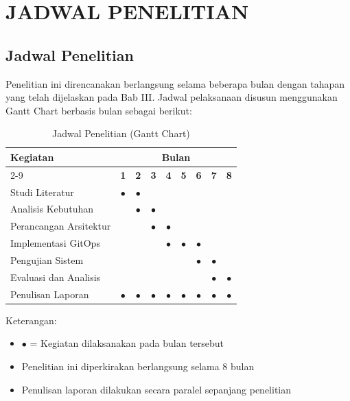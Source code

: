 \chapter{JADWAL PENELITIAN}

\section{Jadwal Penelitian}

Penelitian ini direncanakan berlangsung selama beberapa bulan dengan tahapan yang telah dijelaskan pada Bab III. Jadwal pelaksanaan disusun menggunakan Gantt Chart berbasis bulan sebagai berikut:

\begin{table}[H]
\centering
\caption{Jadwal Penelitian (Gantt Chart)}
\begin{tabular}{|l|c|c|c|c|c|c|c|c|}
\hline
\multirow{2}{*}{\textbf{Kegiatan}} & \multicolumn{8}{c|}{\textbf{Bulan}} \\
\cline{2-9}
 & \textbf{1} & \textbf{2} & \textbf{3} & \textbf{4} & \textbf{5} & \textbf{6} & \textbf{7} & \textbf{8} \\
\hline
Studi Literatur & $\bullet$ & $\bullet$ & & & & & & \\
\hline
Analisis Kebutuhan & & $\bullet$ & $\bullet$ & & & & & \\
\hline
Perancangan Arsitektur & & & $\bullet$ & $\bullet$ & & & & \\
\hline
Implementasi GitOps & & & & $\bullet$ & $\bullet$ & $\bullet$ & & \\
\hline
Pengujian Sistem & & & & & & $\bullet$ & $\bullet$ & \\
\hline
Evaluasi dan Analisis & & & & & & & $\bullet$ & $\bullet$ \\
\hline
Penulisan Laporan & $\bullet$ & $\bullet$ & $\bullet$ & $\bullet$ & $\bullet$ & $\bullet$ & $\bullet$ & $\bullet$ \\
\hline
\end{tabular}
\end{table}

Keterangan:
\begin{itemize}
    \item $\bullet$ = Kegiatan dilaksanakan pada bulan tersebut
    \item Penelitian ini diperkirakan berlangsung selama 8 bulan
    \item Penulisan laporan dilakukan secara paralel sepanjang penelitian
\end{itemize}

